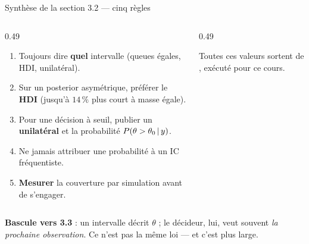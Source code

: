\begin{frame}{Synthèse de la section 3.2 --- cinq règles}
\small
\vspace{-1mm}
\begin{columns}[t]
\begin{column}{0.49\textwidth}
\begin{kbox}
\begin{enumerate}
  \item Toujours dire \textbf{quel} intervalle (queues égales, HDI, unilatéral).
  \item Sur un posterior asymétrique, préférer le \textbf{HDI}
        (jusqu'à $14\,\%$ plus court à masse égale).
  \item Pour une décision à seuil, publier un \textbf{unilatéral} et la
        probabilité $P(\theta > \theta_0 \,\vert\, y)$.
  \item Ne jamais attribuer une probabilité à un IC fréquentiste.
  \item \textbf{Mesurer} la couverture par simulation avant de s'engager.
\end{enumerate}
\end{kbox}
\end{column}
\begin{column}{0.49\textwidth}
\begin{ebox}
\vspace{1.5mm}
\tiny Toutes ces valeurs sortent de , exécuté pour ce cours.
\end{ebox}
\end{column}
\end{columns}
\vspace{1mm}
\begin{tcolorbox}[colback=byCyan!8,colframe=byCyan,arc=2mm,width=.96\textwidth]
\centering\small
\textbf{Bascule vers 3.3} : un intervalle décrit $\theta$ ; le décideur, lui, veut
souvent \emph{la prochaine observation}. Ce n'est pas la même loi --- et c'est plus large.
\end{tcolorbox}
\end{frame}

